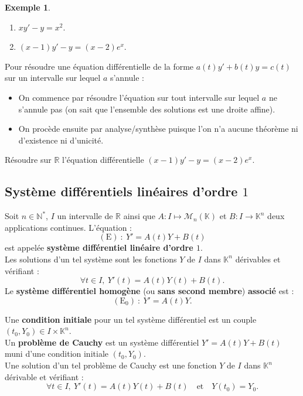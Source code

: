 \documentclass[french]{article}
\newcommand{\N}{\mathbb{N}}
\newcommand{\R}{\mathbb{R}}
\newcommand{\K}{\mathbb{K}}
\newcommand{\st}{^*}
\theoremstyle{plain}
\theoremstyle{definition}
\newtheorem*{ex}{Exemple}
\theoremstyle{remark}
\begin{document}
\begin{ex}
	\begin{enumerate}
		\item $xy'-y=x^2$. %
		\item $(x-1)y'-y=(x-2)e^x$. %
	\end{enumerate}
\end{ex}

\begin{met}
	Pour résoudre une équation différentielle de la forme $a(t)y'+b(t)y=c(t)$ sur un intervalle sur lequel $a$ s'annule :
	\begin{itemize}
		\item On commence par résoudre l'équation sur tout intervalle sur lequel $a$ ne s'annule pas (on sait que l'ensemble des solutions est une droite affine).
		\item On procède ensuite par analyse/synthèse puisque l'on n'a aucune théorème ni d'existence ni d'unicité.
	\end{itemize}
\end{met}

\begin{exo}
	Résoudre sur $\R$ l'équation différentielle $(x-1)y'-y=(x-2)e^x$.
\end{exo}

\subsection{Système différentiels linéaires d'ordre $1$}

\begin{dfn}
	Soit $n\in\N\st$, $I$ un intervalle de $\R$ ainsi que $A:I\mapsto\mathcal{M}_n(\K)$ et $B:I\to\K^n$ deux applications continues. L'équation :
	$$(\text{E})\ :\ Y'=A(t)Y+B(t)$$ est appelée \textbf{système différentiel linéaire d'ordre $1$}. \\
	Les solutions d'un tel système sont les fonctions $Y$ de $I$ dans $\K^n$ dérivables et vérifiant :
	$$\forall t\in I,\ Y'(t)=A(t)Y(t)+B(t).$$
	Le \textbf{système différentiel homogène} (ou \textbf{sans second membre}) \textbf{associé} est :
	$$(\text{E}_0)\ :\ Y'=A(t)Y.$$
\end{dfn}

\begin{dfn}
	Une \textbf{condition initiale} pour un tel système différentiel est un couple $(t_0,Y_0)\in I\times\K^n$.\\
	Un \textbf{problème de Cauchy} est un système différentiel $Y'=A(t)Y+B(t)$ muni d'une condition initiale $(t_0,Y_0)$.\\
	Une solution d'un tel problème de Cauchy est une fonction $Y$ de $I$ dans $\K^n$ dérivable et vérifiant :
	$$\forall t\in I,\ Y'(t)=A(t)Y(t)+B(t)\quad\text{et}\quad Y(t_0)=Y_0.$$
\end{dfn}
\end{document}
